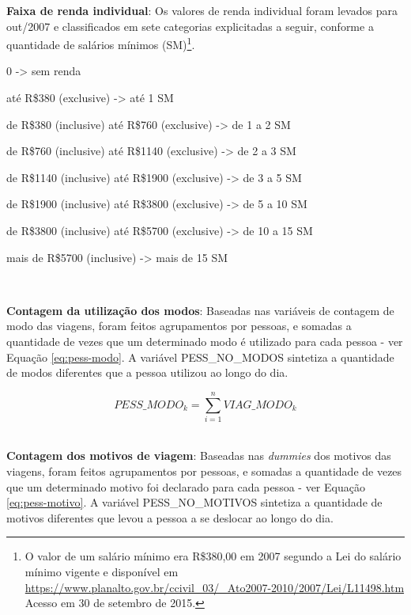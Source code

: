 \begin{compactitem}
\item \textbf{Faixa de renda individual}: Os valores de renda individual foram levados para out/2007 e classificados em sete categorias explicitadas a seguir, conforme a quantidade de salários mínimos (SM)\footnote{O valor de um salário mínimo era R\$380,00 em 2007 segundo a Lei do salário mínimo vigente e disponível em \url{ https://www.planalto.gov.br/ccivil_03/_Ato2007-2010/2007/Lei/L11498.htm} Acesso em 30 de setembro de 2015.}.
    \begin{compactitem}[]
    \item 0 -> sem renda
    \item até R\$380 (exclusive) -> até 1 SM
    \item de R\$380 (inclusive) até R\$760 (exclusive) -> de 1 a 2 SM
    \item de R\$760 (inclusive) até R\$1140 (exclusive) -> de 2 a 3 SM
    \item de R\$1140 (inclusive) até R\$1900 (exclusive) -> de 3 a 5 SM
    \item de R\$1900 (inclusive) até R\$3800 (exclusive) -> de 5 a 10 SM
    \item de R\$3800 (inclusive) até R\$5700 (exclusive) -> de 10 a 15 SM 
    \item mais de R\$5700 (inclusive) -> mais de 15 SM        
    \end{compactitem}\

\item \textbf{Contagem da utilização dos modos}: Baseadas nas variáveis de contagem de modo das viagens, foram feitos agrupamentos por pessoas, e somadas a quantidade de vezes que um determinado modo é utilizado para cada pessoa - ver Equação \eqref{eq:pess-modo}.
A variável PESS_NO_MODOS sintetiza a quantidade de modos diferentes que a pessoa utilizou ao longo do dia.

\begin{equation}\label{eq:pess-modo}
PESS\_MODO_{k}=\displaystyle\sum_{i=1}^{n}VIAG\_MODO_{k}
\end{equation}\\

\item \textbf{Contagem dos motivos de viagem}: Baseadas nas \textit{dummies} dos motivos das viagens, foram feitos agrupamentos por pessoas, e somadas a quantidade de vezes que um determinado motivo foi declarado para cada pessoa - ver Equação \eqref{eq:pess-motivo}.
A variável PESS_NO_MOTIVOS sintetiza a quantidade de motivos diferentes que levou a pessoa a se deslocar ao longo do dia.


\end{compactitem}
